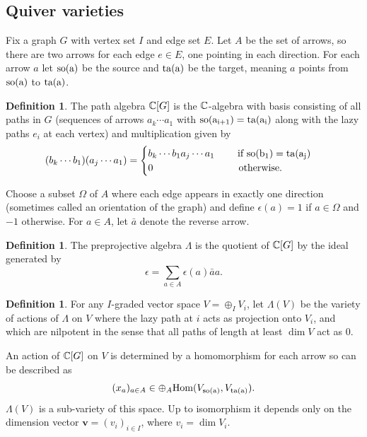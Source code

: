 \documentclass{amsart}
\numberwithin{equation}{section}
\numberwithin{figure}{section}
\numberwithin{table}{section}
\theoremstyle{definition}
\newtheorem{Definition}[equation]{Definition}
\newcommand{\bfv}{{\bm v}}
\newcommand{\Hom}{\text{Hom}}
\newcommand{\so}{\rm so}
\newcommand{\ta}{\rm ta}
\begin{document}
\subsection{Quiver varieties } \label{ss:QV}

Fix a graph $G$ with vertex set $I$ and edge set $E$. Let $A$ be the set of arrows, so there are two arrows for each edge $e \in E$, one pointing in each direction. For each arrow $a$ let $\so(a)$ be the source and $\ta(a)$ be the target, meaning $a$ points from $\so(a)$ to $\ta(a)$. 
\begin{Definition}
The path algebra ${\Bbb C}[G]$ is the ${\Bbb C}$-algebra with basis consisting of all paths in $G$ (sequences of arrows $a_k \cdots a_1$ with $\so(a_{i+1})=\ta(a_i)$ along with the lazy paths $e_i$ at each vertex) and multiplication given by 
$$(b_{k} \cdots b_1) (a_j \cdots a_1) = 
\begin{cases}
b_k \cdots b_1 a_j \cdots a_1 \quad \quad \text{ if } \so(b_1)=\ta(a_j) \\
0 \quad \quad \quad \quad \quad  \quad \quad \quad \ \   \text{otherwise}.
\end{cases}
$$
\end{Definition}
\noindent Choose a subset $\Omega$ of $A$ where each edge appears in exactly one direction (sometimes called an orientation of the graph) and define $\epsilon(a)= 1$ if $a \in \Omega$ and $-1$ otherwise. For $a \in  A$, let $\bar a$ denote the reverse arrow. 

\begin{Definition}
The preprojective algebra $\Lambda$ is the quotient of ${\Bbb C}[G]$ by the ideal generated by
$$\epsilon =   \sum_{a \in A} \epsilon (a) \bar a a.$$
\end{Definition}



\begin{Definition}
For any $I$-graded vector space $V = \oplus_I V_i$, let $\Lambda(V)$ be the variety of actions of $\Lambda$ on $V$ where the lazy path at $i$ acts as projection onto $V_i$, and which are nilpotent in the sense that all paths of length at least $\dim V$ act as $0$. 
\end{Definition}

An action of ${\Bbb C}[G]$ on $V$ is determined by a homomorphism for each arrow so can be described as $$(x_a)_{a\in A} \in \oplus_A \Hom (V_{\so(a)}, V_{\ta(a)}).$$
$\Lambda(V)$ is a sub-variety of this space. Up to isomorphism it depends only on the dimension vector $\bfv =(v_i)_{i \in I}$, where $v_i= \dim V_i$. 
\end{document}

